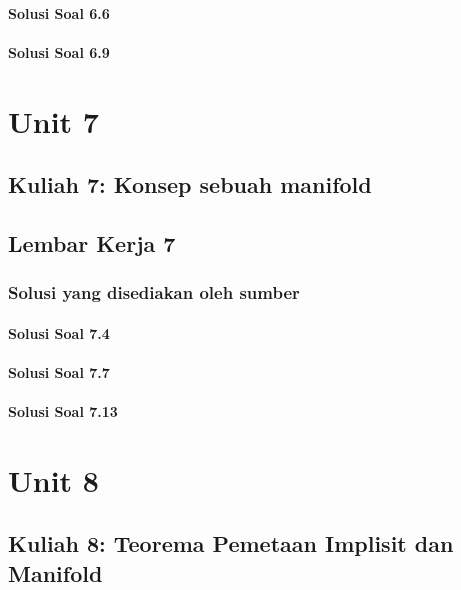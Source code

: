 \documentclass[11pt,a4paper,oneside]{book}
\begin{document}
\subsection*{Solusi Soal 6.6}

\subsection*{Solusi Soal 6.9}


\part{Unit 7}
\chapter[Kuliah 7]{Kuliah 7: Konsep sebuah manifold}


\chapter{Lembar Kerja 7}


\section*{Solusi yang disediakan oleh sumber}
\subsection*{Solusi Soal 7.4}

\subsection*{Solusi Soal 7.7}

\subsection*{Solusi Soal 7.13}


\part{Unit 8}
\chapter[Kuliah 8]{Kuliah 8: Teorema Pemetaan Implisit dan Manifold}

\end{document}
